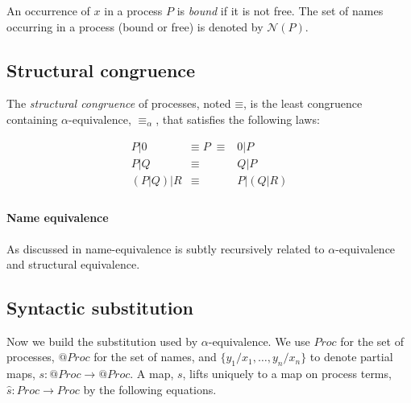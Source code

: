 \documentclass[]{amsart}
\makeatletter
\newcommand{\id}[1]{\texttt{#1}}
\newcommand{\pzero}{\mathbin{0}}
\newcommand{\juxtap}{\mathbin{\id{|}}}
\newcommand{\scong}{\mathbin{\equiv}}
\newcommand{\alphaeq}{\mathbin{\equiv_{\alpha}}}
\newcommand{\names}[1]{\mathbin{\mathcal{N}(#1)}}
\newcommand{\quotep}[1]{@#1}
\newcommand{\Proc}{\mathbin{Proc}}
\newcommand{\QProc}{\quotep{\mathbin{Proc}}}
\theoremstyle{definition}
\theoremstyle{remark}
\numberwithin{equation}{subsection}
\makeatother
\begin{document}
An occurrence of $x$ in a process $P$ is \textit{bound} if it is not
free. The set of names occurring in a process (bound or free) is
denoted by $\names{P}$.

\subsection{Structural congruence}

The {\em structural congruence} of processes, noted $\scong$, is the
least congruence containing $\alpha$-equivalence, $\alphaeq$, that
satisfies the following laws:

\begin{eqnarray*}
	{P} \juxtap \pzero	
		&  \scong \; {P} \; \scong & 
			\pzero \juxtap {P} \\
	{P} \juxtap {Q}	
		& \scong & 
			{Q} \juxtap {P} \\
	({P} \juxtap {Q}) \juxtap {R}
		& \scong & 
			{P} \juxtap ({Q} \juxtap {R}) \\
\end{eqnarray*}

\paragraph{Name equivalence} As discussed in
\cite{DBLP:journals/tgc/MeredithR05} name-equivalence is subtly
recursively related to $\alpha$-equivalence and structural equivalence.

\subsection{Syntactic substitution}

Now we build the substitution used by $\alpha$-equivalence. We use
$\Proc$ for the set of processes, $\QProc$ for the set of names, and
${\{}{y_1} / {x_1}, \ldots, {y_n} / {x_n}{\}}$ to denote partial maps, $s : \QProc
\rightarrow \QProc$. A map, $s$, lifts uniquely to a map on process terms, $\widehat{s} :
\Proc \rightarrow \Proc$ by the following equations.
\end{document}
